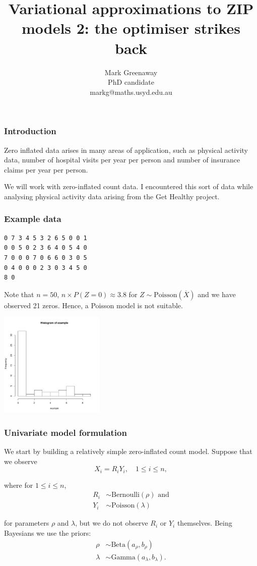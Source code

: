 \documentclass{beamer}
\title{Variational approximations to ZIP models 2: the optimiser strikes back}
\author{Mark Greenaway\\PhD candidate\\markg@maths.usyd.edu.au}
\begin{document}
\begin{frame}
\titlepage
\end{frame}

\begin{frame}
\frametitle{Introduction}
Zero inflated data arises in many areas of application, such as physical
activity data, number of hospital visits per year per person and
number of insurance claims per year per person.

\bigskip 
We will work with zero-inflated count data. I encountered this sort of data 
while analysing physical activity data arising from the Get Healthy project.
\end{frame}

\begin{frame}[fragile]
\frametitle{Example data}
\begin{verbatim}
0 7 3 4 5 3 2 6 5 0 0 1
0 0 5 0 2 3 6 4 0 5 4 0
7 0 0 0 7 0 6 6 0 3 0 5
0 4 0 0 0 2 3 0 3 4 5 0
8 0
\end{verbatim}

\noindent Note that $n=50$, 
$n\times P(Z = 0) \approx 3.8$ for $Z\sim\mbox{Poisson}(\overline{X})$
and we have observed 21 zeros. Hence,
a Poisson model is not suitable.

\includegraphics[width=50mm, height=50mm]{code/univariate_data_histogram.pdf}
\end{frame}

\begin{frame}
\frametitle{Univariate model formulation}

We start by building a relatively simple zero-inflated count model. Suppose that we observe
$$
X_i = R_i Y_i, \quad 1\le i\le n,
$$

\noindent where for $1\le i\le n$,
\begin{align*} 
R_i &\sim \text{Bernoulli}(\rho) \text{ and}\\
Y_i &\sim \text{Poisson}(\lambda)
\end{align*}

\noindent for parameters $\rho$ and $\lambda$,
but we do not observe $R_i$ or $Y_i$ themselves.
Being Bayesians we use the priors:
\begin{align*} 
\rho &\sim \text{Beta}(a_\rho, b_\rho) \\
\lambda &\sim \text{Gamma}(a_\lambda, b_\lambda).
\end{align*}

\end{frame}
\end{document}

